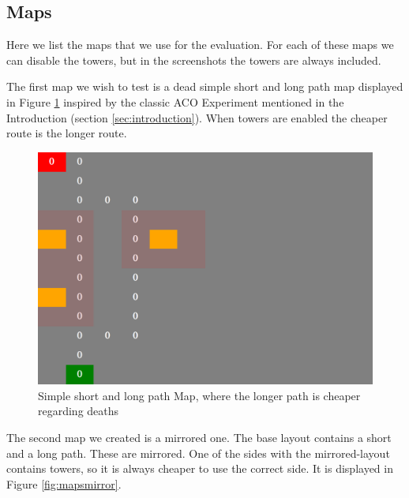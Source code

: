 \subsection{Maps}
\label{sec:testmaps}
Here we list the maps that we use for the evaluation. For each of these maps we can disable the towers, but in the screenshots the towers are always included.

The first map we wish to test is a dead simple short and long path map displayed in Figure \ref{fig:mapshortlong} inspired by the classic ACO Experiment mentioned in the Introduction (section \ref{sec:introduction}). When towers are enabled the cheaper route is the longer route.

\begin{figure}[H]
  \centering
  \includegraphics[width=1\linewidth]{images/map_shortlong}
  \caption{Simple short and long path Map, where the longer path is cheaper regarding deaths}
  \label{fig:mapshortlong}
\end{figure}


The second map we created is a mirrored one. The base layout contains a short and a long path. These are mirrored. One of the sides with the mirrored-layout contains towers, so it is always cheaper to use the correct side. It is displayed in Figure \ref{fig:mapsmirror}.

